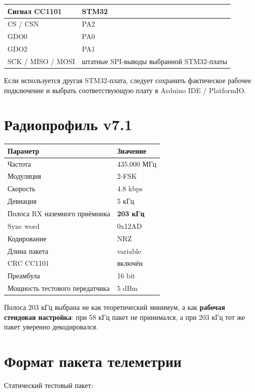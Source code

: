 \documentclass[11pt,a4paper]{article}
\begin{document}
\begin{center}
\begin{tabular}{ll}
\toprule
\textbf{Сигнал CC1101} & \textbf{STM32}\\
\midrule
CS / CSN & PA2\\
GDO0 & PA0\\
GDO2 & PA1\\
SCK / MISO / MOSI & штатные SPI-выводы выбранной STM32-платы\\
\bottomrule
\end{tabular}
\end{center}

Если используется другая STM32-плата, следует сохранить фактическое рабочее подключение и выбрать соответствующую плату в Arduino IDE / PlatformIO.

\section{Радиопрофиль v7.1}

\begin{center}
\begin{tabular}{ll}
\toprule
Параметр & Значение\\
\midrule
Частота & 435.000 МГц\\
Модуляция & 2-FSK\\
Скорость & 4.8 kbps\\
Девиация & 5 кГц\\
Полоса RX наземного приёмника & \textbf{203 кГц}\\
Sync word & 0x12AD\\
Кодирование & NRZ\\
Длина пакета & variable\\
CRC CC1101 & включён\\
Преамбула & 16 bit\\
Мощность тестового передатчика & 5 dBm\\
\bottomrule
\end{tabular}
\end{center}

Полоса 203 кГц выбрана не как теоретический минимум, а как \textbf{рабочая стендовая настройка}: при 58 кГц пакет не принимался, а при 203 кГц тот же пакет уверенно декодировался.

\section{Формат пакета телеметрии}

Статический тестовый пакет:
\end{document}
